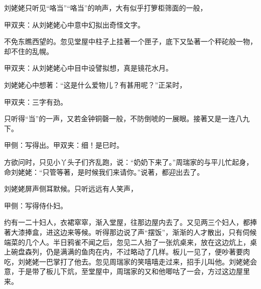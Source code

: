 \begin{parag}
    刘姥姥只听见“咯当”“咯当”的响声，大有似乎打箩柜筛面的一般，\begin{note}甲双夹：从刘姥姥心中意中幻拟出奇怪文字。\end{note}不免东瞧西望的。忽见堂屋中柱子上挂著一个匣子，底下又坠著一个秤砣般一物，却不住的乱幌。\begin{note}甲双夹：从刘姥姥心中目中设譬拟想，真是镜花水月。\end{note}刘姥姥心中想著：“这是什么爱物儿？有甚用呢？”正呆时，\begin{note}甲双夹：三字有劲。\end{note}只听得“当”的一声，又若金钟铜磬一般，不防倒唬的一展眼。接著又是一连八九下。\begin{note}甲侧：写得出。甲双夹：细！是巳时。\end{note}方欲问时，只见小丫头子们齐乱跑，说：“奶奶下来了。”周瑞家的与平儿忙起身，命刘姥姥：“只管等著，是时候我们来请你。”说著，都迎出去了。
\end{parag}


\begin{parag}
    刘姥姥屏声侧耳默候。只听远远有人笑声，\begin{note}甲侧：写得侍仆妇。\end{note}约有一二十妇人，衣裙窣窣，渐入堂屋，往那边屋内去了。又见两三个妇人，都捧著大漆捧盒，进这边来等候。听得那边说了声“摆饭”，渐渐的人才散出，只有伺候端菜的几个人。半日鸦雀不闻之后，忽见二人抬了一张炕桌来，放在这边炕上，桌上碗盘森列，仍是满满的鱼肉在内，不过略动了几样。板儿一见了，便吵著要肉吃，刘姥姥一巴掌打了他去。忽见周瑞家的笑嘻嘻走过来，招手儿叫他。刘姥姥会意，于是带了板儿下炕，至堂屋中，周瑞家的又和他唧咕了一会，方过这边屋里来。
\end{parag}


